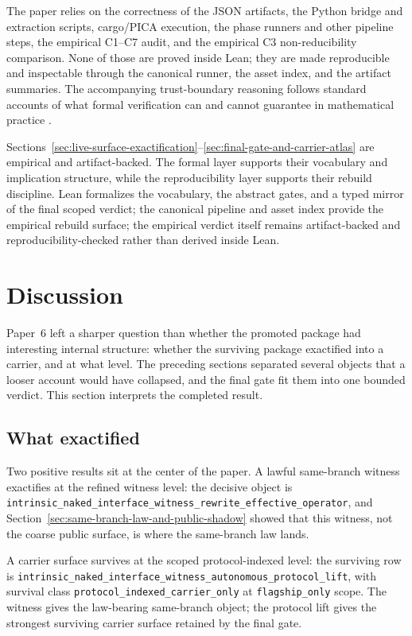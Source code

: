 \documentclass[11pt]{article}
\theoremstyle{definition}
\begin{document}
The paper relies on the correctness of the JSON artifacts, the Python bridge and
extraction scripts, cargo/PICA execution, the phase runners and other pipeline steps,
the empirical C1--C7 audit, and the empirical C3 non-reducibility comparison. None of
those are proved inside Lean; they are made reproducible and inspectable through the
canonical runner, the asset index, and the artifact summaries. The accompanying
trust-boundary reasoning follows standard accounts of what formal verification can
and cannot guarantee in mathematical practice \citep{AvigadHarrison2014}.

Sections~\ref{sec:live-surface-exactification}--\ref{sec:final-gate-and-carrier-atlas}
are empirical and artifact-backed. The formal layer supports their vocabulary and
implication structure, while the reproducibility layer supports their rebuild
discipline. Lean formalizes the vocabulary, the abstract gates, and a typed mirror of
the final scoped verdict; the canonical pipeline and asset index provide the
empirical rebuild surface; the empirical verdict itself remains artifact-backed and
reproducibility-checked rather than derived inside Lean.
 \section{Discussion}
\label{sec:discussion}

Paper~6 left a sharper question than whether the promoted package had interesting
internal structure: whether the surviving package exactified into a carrier, and at
what level. The preceding sections separated several objects that a looser account
would have collapsed, and the final gate fit them into one bounded verdict. This
section interprets the completed result.

\subsection{What exactified}

Two positive results sit at the center of the paper. A lawful same-branch witness
exactifies at the refined witness level: the decisive object is
\nolinkurl{intrinsic_naked_interface_witness_rewrite_effective_operator}, and
Section~\ref{sec:same-branch-law-and-public-shadow} showed that this witness, not the
coarse public surface, is where the same-branch law lands.

A carrier surface survives at the scoped protocol-indexed level: the surviving row is
\nolinkurl{intrinsic_naked_interface_witness_autonomous_protocol_lift}, with survival
class \nolinkurl{protocol_indexed_carrier_only} at \texttt{flagship\_only} scope. The
witness gives the law-bearing same-branch object; the protocol lift gives the
strongest surviving carrier surface retained by the final gate.
\end{document}
